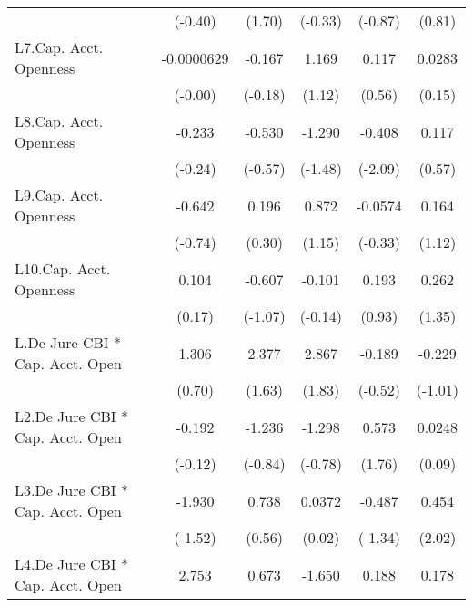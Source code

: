 {\begin{longtable}{l*{5}{c}}
                &  (-0.40)         &   (1.70)         &  (-0.33)         &  (-0.87)         &   (0.81)         \\
[1em]
L7.Cap. Acct. Openness&-0.0000629         &   -0.167         &    1.169         &    0.117         &   0.0283         \\
                &  (-0.00)         &  (-0.18)         &   (1.12)         &   (0.56)         &   (0.15)         \\
[1em]
L8.Cap. Acct. Openness&   -0.233         &   -0.530         &   -1.290         &   -0.408\sym{*}  &    0.117         \\
                &  (-0.24)         &  (-0.57)         &  (-1.48)         &  (-2.09)         &   (0.57)         \\
[1em]
L9.Cap. Acct. Openness&   -0.642         &    0.196         &    0.872         &  -0.0574         &    0.164         \\
                &  (-0.74)         &   (0.30)         &   (1.15)         &  (-0.33)         &   (1.12)         \\
[1em]
L10.Cap. Acct. Openness&    0.104         &   -0.607         &   -0.101         &    0.193         &    0.262         \\
                &   (0.17)         &  (-1.07)         &  (-0.14)         &   (0.93)         &   (1.35)         \\
[1em]
L.De Jure CBI * Cap. Acct. Open&    1.306         &    2.377         &    2.867         &   -0.189         &   -0.229         \\
                &   (0.70)         &   (1.63)         &   (1.83)         &  (-0.52)         &  (-1.01)         \\
[1em]
L2.De Jure CBI * Cap. Acct. Open&   -0.192         &   -1.236         &   -1.298         &    0.573         &   0.0248         \\
                &  (-0.12)         &  (-0.84)         &  (-0.78)         &   (1.76)         &   (0.09)         \\
[1em]
L3.De Jure CBI * Cap. Acct. Open&   -1.930         &    0.738         &   0.0372         &   -0.487         &    0.454\sym{*}  \\
                &  (-1.52)         &   (0.56)         &   (0.02)         &  (-1.34)         &   (2.02)         \\
[1em]
L4.De Jure CBI * Cap. Acct. Open&    2.753         &    0.673         &   -1.650         &    0.188         &    0.178         \\

\end{longtable}}
